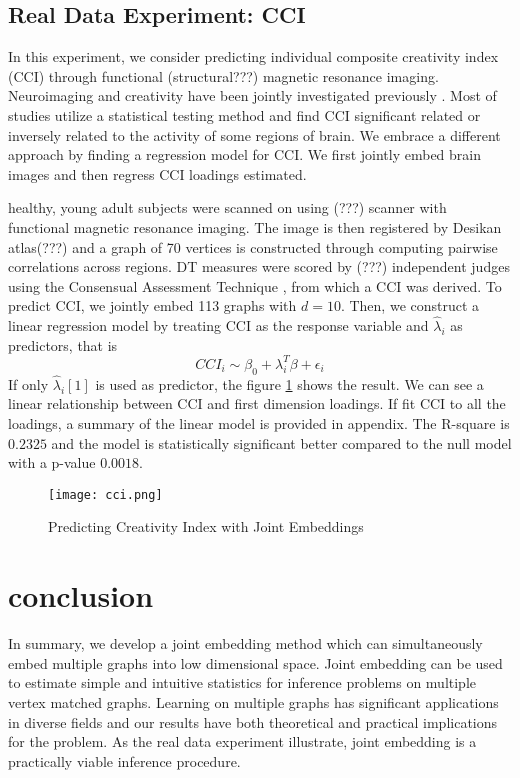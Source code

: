 \documentclass[10pt,journal,compsoc]{IEEEtran}
\begin{document}
\subsection{Real Data Experiment: CCI}
In this experiment, we consider predicting individual composite creativity index (CCI) through functional (structural???) magnetic resonance imaging. Neuroimaging and creativity have been jointly investigated previously \cite{arden2010neuroimaging}. Most of studies utilize a statistical testing method and find CCI significant related or inversely related to the activity of some regions of brain. We embrace a different approach by finding a regression model for CCI. We first jointly embed brain images and then regress CCI loadings estimated.

 healthy, young adult subjects were scanned on using (???) scanner with functional magnetic resonance imaging. The image is then registered by Desikan atlas(???) \cite{desikan2006automated} and a graph of 70 vertices is constructed through computing pairwise correlations across regions. DT measures were scored by (???) independent judges using the Consensual Assessment Technique \cite{amabile1983social}, from which a CCI was derived. To predict CCI, we jointly embed 113 graphs with $d=10$. Then, we construct a linear regression model by treating CCI as the response variable and $\hat{\lambda}_i$ as predictors, that is
\[CCI_i \sim \beta_0+\lambda_i^T\beta + \epsilon_i \]
If only $\hat{\lambda}_i[1]$ is used as predictor, the figure \ref{fig:cci} shows the result. We can see a linear relationship between CCI and first dimension loadings. If fit CCI to all the loadings, a summary of the linear model is provided in appendix. The R-square is $0.2325$ and the model is statistically significant better compared to the null model with a p-value $0.0018$. 
\begin{figure}[!htbp]
	\centering
	\texttt{[image: cci.png]}
	\caption{Predicting Creativity Index with Joint Embeddings}
	\label{fig:cci}
\end{figure}



\section{conclusion}
In summary, we develop a joint embedding method which can simultaneously embed multiple graphs into low dimensional space. Joint embedding can
be used to estimate simple and intuitive statistics for inference problems on multiple vertex matched graphs. Learning on multiple graphs has significant applications in diverse fields and our results have both theoretical and practical implications for the problem. As the real data experiment illustrate, joint embedding is a practically viable inference procedure. \\
\end{document}
